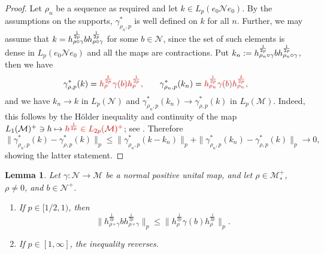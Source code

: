 \documentclass[12pt]{article}
\newtheorem{lemma}[theorem]{Lemma}
\theoremstyle{definition}
\theoremstyle{remark}
\numberwithin{equation}{section}
\def\Me{\mathcal M}
\def\Ne{\mathcal N}
\begin{document}
\begin{proof}
Let $\rho_n$ be a sequence as required and let $k\in L_p(e_0 \Ne e_0)$. By the
assumptions on the supports, $\gamma^*_{\rho_n,p}$ is well defined on $k$ for all $n$.
Further, we may assume that $k=h_{\rho\circ\gamma}^{1\over 2p}b
h_{\rho\circ\gamma}^{1\over 2p}$ for some $b\in \Ne$, since the set of such elements is
dense in $L_p(e_0 \Ne e_0)$ and all the maps are contractions. 
Put $k_n:=h_{\rho_n\circ\gamma}^{1\over 2p}b
h_{\rho_n\circ\gamma}^{1\over 2p}$, then we have
\[
\gamma^*_{\rho,p}(k)={\color{red}h_\rho^{1\over2p}\gamma(b)h_\rho^{1\over2p},}\qquad
\gamma^*_{\rho_n,p}(k_n)= {\color{red}h_{\rho_n}^{1\over2p}\gamma(b)h_{\rho_n}^{1\over2p},}
\]
and we have $k_n\to k$ in $L_p(\Ne)$ and  $\gamma^*_{\rho_n,p}(k_n)\to
\gamma^*_{\rho,p}(k)$ in $L_p(\Me)$. Indeed, this follows by the H\"older inequality and continuity
of the map $L_1(\Me)^+\ni h\mapsto {\color{red}h^{1\over2p}\in L_{2p}(\Me)^+}$; see
\cite[Lemma 3.4]{kosaki1984applicationsuc}. Therefore
\[
\|\gamma^*_{\rho_n,p}(k)-\gamma^*_{\rho,p}(k)\|_p\le
\|\gamma^*_{\rho_n,p}(k-k_n)\|_p+\|\gamma^*_{\rho_n,p}(k_n)-\gamma^*_{\rho,p}(k)\|_p\to 0,
\]
showing the latter statement.
\end{proof}


\begin{lemma}\label{lemma:dpi} Let $\gamma:\Ne\to \Me$ be a normal positive unital map, and
let $\rho\in \Me_*^+$, {\color{red}$\rho\ne0$, and} $b\in \Ne^+$. 
\begin{enumerate}
\item[(i)]  If $p\in [1/2,1)$, then 
\[
\Big\|h_{\rho\circ\gamma}^{\frac{1}{2p}}bh_{\rho\circ\gamma}^{\frac{1}{2p}}\Big\|_p\le
\Big\|h_{\rho}^{\frac{1}{2p}}\gamma(b)h_{\rho}^{\frac{1}{2p}}\Big\|_p.
\]

\item[(ii)]  If $p\in [1,\infty]$, the inequality reverses.
\end{enumerate}
\end{lemma}
\end{document}
